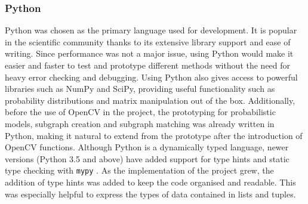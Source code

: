 \subsubsection{Python}
Python was chosen as the primary language used for development. It is popular in the scientific community thanks to its extensive library support and ease of writing. Since performance was not a major issue, using Python would make it easier and faster to test and prototype different methods without the need for heavy error checking and debugging. Using Python also gives access to powerful libraries such as NumPy and SciPy, providing useful functionality such as probability distributions and matrix manipulation out of the box. Additionally, before the use of OpenCV in the project, the prototyping for probabilistic models, subgraph creation and subgraph matching was already written in Python, making it natural to extend from the prototype after the introduction of OpenCV functions. 
\n
Although Python is a dynamically typed language, newer versions (Python 3.5 and above) have added support for type hints and static type checking with \texttt{mypy} \cite{mypy}. As the implementation of the project grew, the addition of type hints was added to keep the code organised and readable. This was especially helpful to express the types of data contained in lists and tuples. 